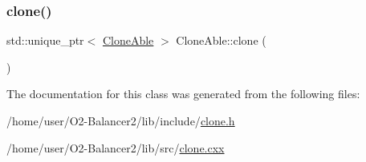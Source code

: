 \subsubsection{\texorpdfstring{clone()}{clone()}}
{\footnotesize\ttfamily std\+::unique\+\_\+ptr$<$ \hyperlink{classCloneAble}{Clone\+Able} $>$ Clone\+Able\+::clone (\begin{DoxyParamCaption}{ }\end{DoxyParamCaption})}



The documentation for this class was generated from the following files\+:\begin{DoxyCompactItemize}
\item 
/home/user/\+O2-\/\+Balancer2/lib/include/\hyperlink{clone_8h}{clone.\+h}\item 
/home/user/\+O2-\/\+Balancer2/lib/src/\hyperlink{clone_8cxx}{clone.\+cxx}\end{DoxyCompactItemize}
